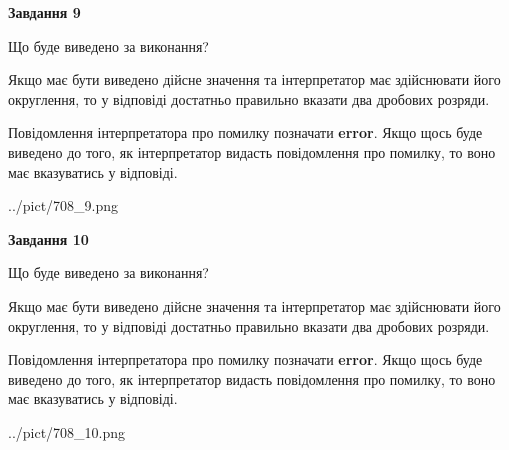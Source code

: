 \documentclass[12pt, ukrainian]{article}
\begin{document}
{\begin {Large}
{\begin {center}\textbf{Завдання 9}\end {center}}\par
Що буде виведено за виконання? \par

Якщо має бути виведено дійсне значення та інтерпретатор має здійснювати його округлення, 
то у відповіді достатньо правильно вказати два дробових розряди.

Повідомлення інтерпретатора про помилку позначати \textbf{error}.
Якщо щось буде виведено до того, як інтерпретатор видасть повідомлення про помилку, 
то воно має вказуватись у відповіді. \par

\begin{center}
	{../pict/708_9.png}
\end{center}
\newpage

{\begin {center}\textbf{Завдання 10}\end {center}}\par
Що буде виведено за виконання? \par

Якщо має бути виведено дійсне значення та інтерпретатор має здійснювати його округлення, 
то у відповіді достатньо правильно вказати два дробових розряди.

Повідомлення інтерпретатора про помилку позначати \textbf{error}.
Якщо щось буде виведено до того, як інтерпретатор видасть повідомлення про помилку, 
то воно має вказуватись у відповіді. \par

\begin{center}
	{../pict/708_10.png}
\end{center}
\newpage

\end {Large}}
\end{document}
